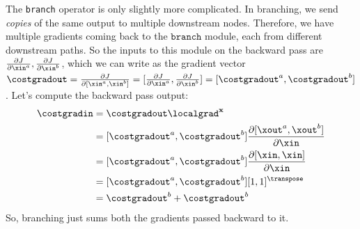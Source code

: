 The \texttt{branch} operator is only slightly more complicated. In branching, we send \textit{copies} of the same output to multiple downstream nodes. Therefore, we have multiple gradients coming back to the $\texttt{branch}$ module, each from different downstream paths. So the inputs to this module on the backward pass are $\frac{\partial J}{\partial \xin^{a}}, \frac{\partial J}{\partial \xin^{b}}$, which we can write as the gradient vector $\costgradout = \frac{\partial J}{\partial [\xin^a, \xin^b]} = [\frac{\partial J}{\partial \xin^{a}}, \frac{\partial J}{\partial \xin^{b}}] = [\costgradout^a, \costgradout^b]$.  Let's compute the backward pass output:
\begin{align}
    \costgradin & = \costgradout \localgrad^{\mathbf{x}}                                               \\
                & = [\costgradout^a, \costgradout^b] \frac{\partial [\xout^a, \xout^b]}{\partial \xin} \\
                & = [\costgradout^a, \costgradout^b] \frac{\partial [\xin, \xin]}{\partial \xin}       \\
                & = [\costgradout^a, \costgradout^b][1, 1]^\transpose                                  \\
                & = \costgradout^b + \costgradout^b
\end{align}
So, branching just sums both the gradients passed backward to it.


